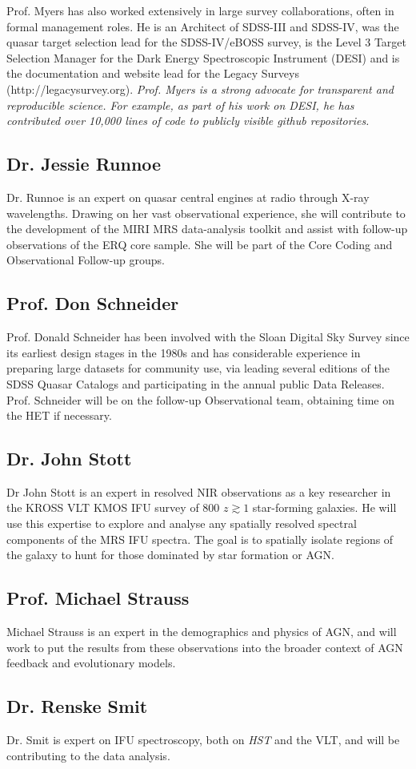 \documentclass[11pt,a4paper]{article}
\begin{document}
\smallskip \smallskip
\noindent
Prof. Myers has also worked extensively in large survey
collaborations, often in formal management roles. He is an Architect
of SDSS-III and SDSS-IV, was the quasar target selection lead for the
SDSS-IV/eBOSS survey, is the Level 3 Target Selection Manager for the
Dark Energy Spectroscopic Instrument (DESI) and is the documentation
and website lead for the Legacy Surveys
(http://legacysurvey.org). {\it Prof. Myers is a strong advocate for
transparent and reproducible science. For example, as part of his work
on DESI, he has contributed over 10,000 lines of code to publicly
visible github repositories.}


\subsection*{Dr. Jessie Runnoe}
Dr. Runnoe is an expert on quasar central engines at radio through
X-ray wavelengths.  Drawing on her vast observational experience, she
will contribute to the development of the MIRI MRS data-analysis
toolkit and assist with follow-up observations of the ERQ core sample.
She will be part of the Core Coding and Observational Follow-up
groups.


\subsection*{Prof. Don Schneider}
Prof. Donald Schneider has been involved with the Sloan Digital Sky
Survey since its earliest design stages in the 1980s and has
considerable experience in preparing large datasets for community use,
via leading several editions of the SDSS Quasar Catalogs and
participating in the annual public Data Releases. Prof. Schneider will
be on the follow-up Observational team, obtaining time on the HET if
necessary.


\subsection*{Dr. John Stott}
Dr John Stott is an expert in resolved NIR observations as a key
researcher in the KROSS VLT KMOS IFU survey of 800 $z\gtrsim1$
star-forming galaxies. He will use this expertise to explore and
analyse any spatially resolved spectral components of the MRS IFU
spectra. The goal is to spatially isolate regions of the galaxy to
hunt for those dominated by star formation or AGN.


\subsection*{Prof. Michael  Strauss}
Michael Strauss is an expert in the demographics and physics of AGN, and will work to 
put the results from these observations into the broader context of AGN feedback and 
evolutionary models. 


\subsection*{Dr. Renske Smit}		
Dr. Smit is expert on IFU spectroscopy, both on {\it HST} and the VLT,
and will be contributing to the data analysis.

\end{document}
